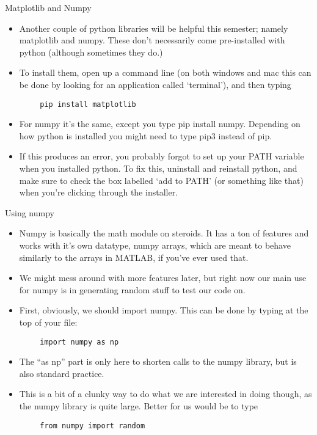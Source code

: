 \documentclass{beamer}
\begin{document}
\begin{frame}[fragile]{Matplotlib and Numpy}
    \begin{itemize}
        \item Another couple of python libraries will be helpful this semester; namely matplotlib and numpy. These don't necessarily come pre-installed with python (although sometimes they do.) 
        \item To install them, open up a command line (on both windows and mac this can be done by looking for an application called `terminal'), and then typing
    \end{itemize}
    \begin{lstlisting}
        pip install matplotlib
    \end{lstlisting}
    \begin{itemize}
        \item For numpy it's the same, except you type pip install numpy. Depending on how python is installed you might need to type pip3 instead of pip. 
        \item If this produces an error, you probably forgot to set up your PATH variable when you installed python. To fix this, uninstall and reinstall python, and make sure to check the box labelled `add to PATH' (or something like that) when you're clicking through the installer. 
    \end{itemize}
\end{frame}

\begin{frame}[fragile]{Using numpy}
    \begin{itemize}
        \item Numpy is basically the math module on steroids. It has a ton of features and works with it's own datatype, numpy arrays, which are meant to behave similarly to the arrays in MATLAB, if you've ever used that. 
        \item We might mess around with more features later, but right now our main use for numpy is in generating random stuff to test our code on.
        \item First, obviously, we should import numpy. This can be done by typing at the top of your file:
    \end{itemize}
    \begin{verbatim}
        import numpy as np
    \end{verbatim}
    \begin{itemize}
        \item The ``as np'' part is only here to shorten calls to the numpy library, but is also standard practice. 
        \item This is a bit of a clunky way to do what we are interested in doing though, as the numpy library is quite large. Better for us would be to type
    \end{itemize}
    \begin{verbatim}
        from numpy import random
    \end{verbatim}
\end{frame}
\end{document}
